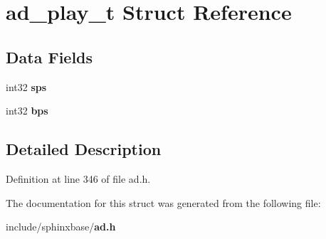\section{ad\-\_\-play\-\_\-t \-Struct \-Reference}
\label{structad__play__t}
\subsection*{\-Data \-Fields}
\begin{DoxyCompactItemize}
\item 
int32 {\bfseries sps}\label{structad__play__t_aa183d6146e18a876b8eb7a7b6f09bfc7}

\item 
int32 {\bfseries bps}\label{structad__play__t_afb37e59f996e4de0123af01f258ea0f1}

\end{DoxyCompactItemize}


\subsection{\-Detailed \-Description}


\-Definition at line 346 of file ad.\-h.



\-The documentation for this struct was generated from the following file\-:\begin{DoxyCompactItemize}
\item 
include/sphinxbase/{\bf ad.\-h}\end{DoxyCompactItemize}
